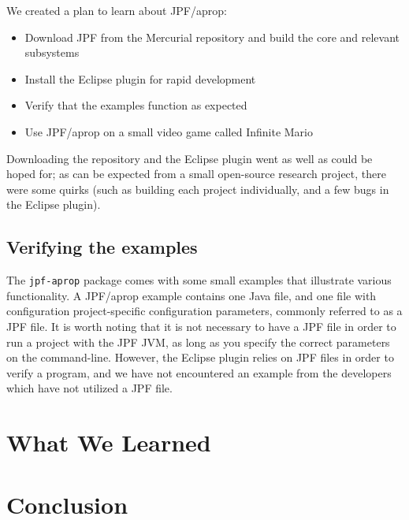 \documentclass[twocolumn]{article}
\begin{document}
We created a plan to learn about JPF/aprop:
\begin{itemize}
	\item Download JPF from the Mercurial repository and build the core and relevant subsystems
	\item Install the Eclipse plugin for rapid development
	\item Verify that the examples function as expected
	\item Use JPF/aprop on a small video game called Infinite Mario
\end{itemize}

Downloading the repository and the Eclipse plugin went as well as could be hoped for; as can be expected from a small open-source research project, there were some quirks (such as building each project individually, and a few bugs in the Eclipse plugin).

\subsection{Verifying the examples}
The \texttt{jpf-aprop} package comes with some small examples that illustrate various functionality. A JPF/aprop example contains one Java file, and one file with configuration project-specific configuration parameters, commonly referred to as a JPF file. It is worth noting that it is not necessary to have a JPF file in order to run a project with the JPF JVM, as long as you specify the correct parameters on the command-line. However, the Eclipse plugin relies on JPF files in order to verify a program, and we have not encountered an example from the developers which have not utilized a JPF file.



\section{What We Learned}

\section{Conclusion}
\end{document}
